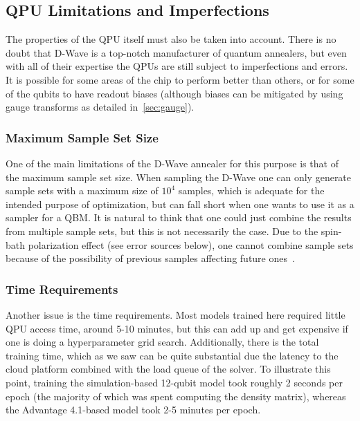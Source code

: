 \subsection{QPU Limitations and Imperfections}
The properties of the QPU itself must also be taken into account.
There is no doubt that D-Wave is a top-notch manufacturer of quantum annealers, but even with all of their expertise the QPUs are still subject to imperfections and errors.
It is possible for some areas of the chip to perform better than others, or for some of the qubits to have readout biases (although biases can be mitigated by using gauge transforms as detailed in~\cref{sec:gauge}).

\subsubsection{Maximum Sample Set Size}
One of the main limitations of the D-Wave annealer for this purpose is that of the maximum sample set size.
When sampling the D-Wave one can only generate sample sets with a maximum size of \( 10^4 \) samples, which is adequate for the intended purpose of optimization, but can fall short when one wants to use it as a sampler for a QBM.
It is natural to think that one could just combine the results from multiple sample sets, but this is not necessarily the case.
Due to the spin-bath polarization effect (see error sources below), one cannot combine sample sets because of the possibility of previous samples affecting future ones~\cite{pochart_2021}.

\subsubsection{Time Requirements}
Another issue is the time requirements.
Most models trained here required little QPU access time, around 5-10 minutes, but this can add up and get expensive if one is doing a hyperparameter grid search.
Additionally, there is the total training time, which as we saw can be quite substantial due the latency to the cloud platform combined with the load queue of the solver.
To illustrate this point, training the simulation-based 12-qubit model took roughly 2 seconds per epoch (the majority of which was spent computing the density matrix), whereas the Advantage 4.1-based model took 2-5 minutes per epoch.


